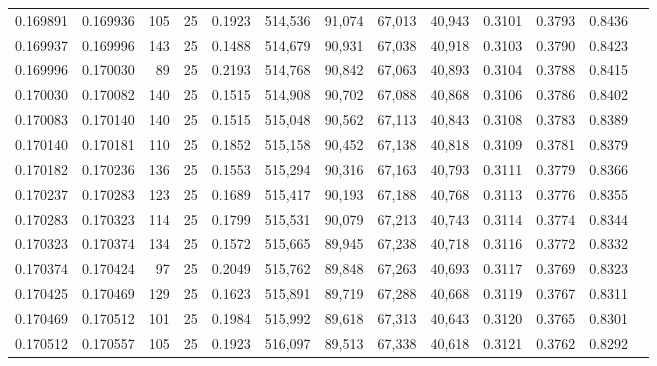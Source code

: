 \begin{tabular}{rrrrrrrrrrrrr}
0.169891 & 0.169936 &   105 &  25 &                                     0.1923 & 514,536 &  91,074 &  67,013 &  40,943 & 0.3101 & 0.3793 & 0.8436 \\
0.169937 & 0.169996 &   143 &  25 &                                     0.1488 & 514,679 &  90,931 &  67,038 &  40,918 & 0.3103 & 0.3790 & 0.8423 \\
0.169996 & 0.170030 &    89 &  25 &                                     0.2193 & 514,768 &  90,842 &  67,063 &  40,893 & 0.3104 & 0.3788 & 0.8415 \\
0.170030 & 0.170082 &   140 &  25 &                                     0.1515 & 514,908 &  90,702 &  67,088 &  40,868 & 0.3106 & 0.3786 & 0.8402 \\
0.170083 & 0.170140 &   140 &  25 &                                     0.1515 & 515,048 &  90,562 &  67,113 &  40,843 & 0.3108 & 0.3783 & 0.8389 \\
0.170140 & 0.170181 &   110 &  25 &                                     0.1852 & 515,158 &  90,452 &  67,138 &  40,818 & 0.3109 & 0.3781 & 0.8379 \\
0.170182 & 0.170236 &   136 &  25 &                                     0.1553 & 515,294 &  90,316 &  67,163 &  40,793 & 0.3111 & 0.3779 & 0.8366 \\
0.170237 & 0.170283 &   123 &  25 &                                     0.1689 & 515,417 &  90,193 &  67,188 &  40,768 & 0.3113 & 0.3776 & 0.8355 \\
0.170283 & 0.170323 &   114 &  25 &                                     0.1799 & 515,531 &  90,079 &  67,213 &  40,743 & 0.3114 & 0.3774 & 0.8344 \\
0.170323 & 0.170374 &   134 &  25 &                                     0.1572 & 515,665 &  89,945 &  67,238 &  40,718 & 0.3116 & 0.3772 & 0.8332 \\
0.170374 & 0.170424 &    97 &  25 &                                     0.2049 & 515,762 &  89,848 &  67,263 &  40,693 & 0.3117 & 0.3769 & 0.8323 \\
0.170425 & 0.170469 &   129 &  25 &                                     0.1623 & 515,891 &  89,719 &  67,288 &  40,668 & 0.3119 & 0.3767 & 0.8311 \\
0.170469 & 0.170512 &   101 &  25 &                                     0.1984 & 515,992 &  89,618 &  67,313 &  40,643 & 0.3120 & 0.3765 & 0.8301 \\
0.170512 & 0.170557 &   105 &  25 &                                     0.1923 & 516,097 &  89,513 &  67,338 &  40,618 & 0.3121 & 0.3762 & 0.8292 \\

\end{tabular}
